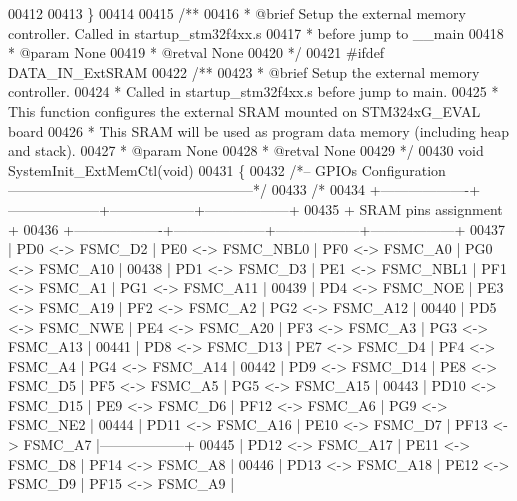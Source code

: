 \begin{DoxyCode}
00412 
00413 \}
00414 
00415 \textcolor{comment}{/**}
00416 \textcolor{comment}{  * @brief  Setup the external memory controller. Called in startup\_stm32f4xx.s }
00417 \textcolor{comment}{  *          before jump to \_\_main}
00418 \textcolor{comment}{  * @param  None}
00419 \textcolor{comment}{  * @retval None}
00420 \textcolor{comment}{  */}
00421 \textcolor{preprocessor}{#}\textcolor{preprocessor}{ifdef} \textcolor{preprocessor}{DATA\_IN\_ExtSRAM}
00422 \textcolor{comment}{/**}
00423 \textcolor{comment}{  * @brief  Setup the external memory controller.}
00424 \textcolor{comment}{  *         Called in startup\_stm32f4xx.s before jump to main.}
00425 \textcolor{comment}{  *         This function configures the external SRAM mounted on STM324xG\_EVAL board}
00426 \textcolor{comment}{  *         This SRAM will be used as program data memory (including heap and stack).}
00427 \textcolor{comment}{  * @param  None}
00428 \textcolor{comment}{  * @retval None}
00429 \textcolor{comment}{  */}
00430 \textcolor{keywordtype}{void} SystemInit\_ExtMemCtl(\textcolor{keywordtype}{void})
00431 \{
00432 \textcolor{comment}{/*-- GPIOs Configuration -----------------------------------------------------*/}
00433 \textcolor{comment}{/*}
00434 \textcolor{comment}{ +-------------------+--------------------+------------------+------------------+}
00435 \textcolor{comment}{ +                       SRAM pins assignment                                   +}
00436 \textcolor{comment}{ +-------------------+--------------------+------------------+------------------+}
00437 \textcolor{comment}{ | PD0  <-> FSMC\_D2  | PE0  <-> FSMC\_NBL0 | PF0  <-> FSMC\_A0 | PG0 <-> FSMC\_A10 | }
00438 \textcolor{comment}{ | PD1  <-> FSMC\_D3  | PE1  <-> FSMC\_NBL1 | PF1  <-> FSMC\_A1 | PG1 <-> FSMC\_A11 | }
00439 \textcolor{comment}{ | PD4  <-> FSMC\_NOE | PE3  <-> FSMC\_A19  | PF2  <-> FSMC\_A2 | PG2 <-> FSMC\_A12 | }
00440 \textcolor{comment}{ | PD5  <-> FSMC\_NWE | PE4  <-> FSMC\_A20  | PF3  <-> FSMC\_A3 | PG3 <-> FSMC\_A13 | }
00441 \textcolor{comment}{ | PD8  <-> FSMC\_D13 | PE7  <-> FSMC\_D4   | PF4  <-> FSMC\_A4 | PG4 <-> FSMC\_A14 | }
00442 \textcolor{comment}{ | PD9  <-> FSMC\_D14 | PE8  <-> FSMC\_D5   | PF5  <-> FSMC\_A5 | PG5 <-> FSMC\_A15 | }
00443 \textcolor{comment}{ | PD10 <-> FSMC\_D15 | PE9  <-> FSMC\_D6   | PF12 <-> FSMC\_A6 | PG9 <-> FSMC\_NE2 | }
00444 \textcolor{comment}{ | PD11 <-> FSMC\_A16 | PE10 <-> FSMC\_D7   | PF13 <-> FSMC\_A7 |------------------+}
00445 \textcolor{comment}{ | PD12 <-> FSMC\_A17 | PE11 <-> FSMC\_D8   | PF14 <-> FSMC\_A8 | }
00446 \textcolor{comment}{ | PD13 <-> FSMC\_A18 | PE12 <-> FSMC\_D9   | PF15 <-> FSMC\_A9 | }

\end{DoxyCode}
